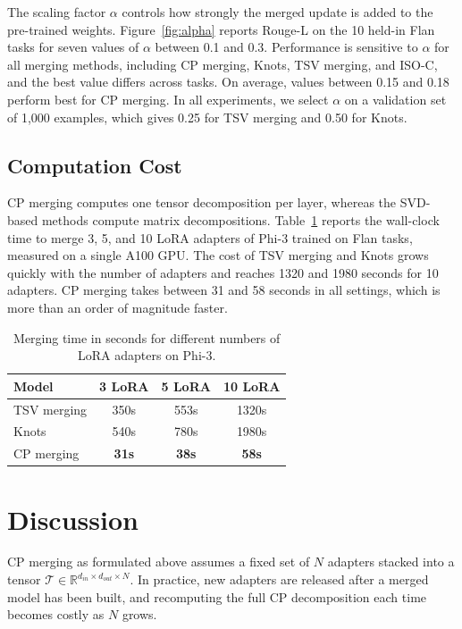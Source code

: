\documentclass[10pt]{article} %
\begin{document}
The scaling factor $\alpha$ controls how strongly the merged update is added to the pre-trained weights. Figure~\ref{fig:alpha} reports Rouge-L on the 10 held-in Flan tasks for seven values of $\alpha$ between 0.1 and 0.3. Performance is sensitive to $\alpha$ for all merging methods, including CP merging, Knots, TSV merging, and ISO-C, and the best value differs across tasks. On average, values between 0.15 and 0.18 perform best for CP merging. In all experiments, we select $\alpha$ on a validation set of 1,000 examples, which gives 0.25 for TSV merging and 0.50 for Knots.

\subsection{Computation Cost}



CP merging computes one tensor decomposition per layer, whereas the SVD-based methods compute matrix decompositions. Table~\ref{tab:computation_copmarison} reports the wall-clock time to merge 3, 5, and 10 LoRA adapters of Phi-3 trained on Flan tasks, measured on a single A100 GPU. The cost of TSV merging and Knots grows quickly with the number of adapters and reaches 1320 and 1980 seconds for 10 adapters. CP merging takes between 31 and 58 seconds in all settings, which is more than an order of magnitude faster.
\begin{table}
    \centering
    \begin{tabular}{l|ccc}
    \toprule
      Model  & 3 LoRA & 5 LoRA & 10 LoRA \\
    \midrule
     TSV merging & 350s & 553s & 1320s\\
     Knots & 540s & 780s & 1980s\\
     \midrule
     CP merging & \textbf{31s} & \textbf{38s} & \textbf{58s}\\
     \bottomrule
    \end{tabular}
    \caption{Merging time in seconds for different numbers of LoRA adapters on Phi-3.}
    \label{tab:computation_copmarison}
\end{table}

\section{Discussion}

CP merging as formulated above assumes a fixed set of $N$ adapters stacked into a tensor $\mathcal{T} \in \mathbb{R}^{d_{in} \times d_{out} \times N}$. In practice, new adapters are released after a merged model has been built, and recomputing the full CP decomposition each time becomes costly as $N$ grows.
\end{document}
